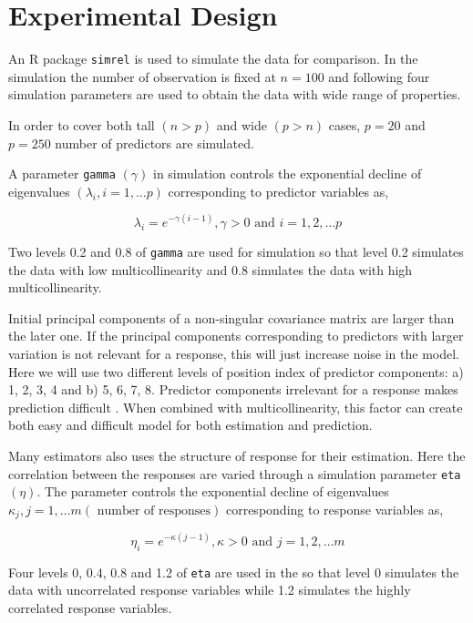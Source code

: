 \documentclass[12pt,3p,authoryear]{elsarticle}
\providecommand{\tightlist}{%
  \setlength{\itemsep}{0pt}\setlength{\parskip}{0pt}}
\begin{document}
\hypertarget{experimental-design}{\section{Experimental
Design}\label{experimental-design}}

An R \citep{coreR2018} package \texttt{simrel}
\citep{Rimal2018, saebo2015simrel} is used to simulate the data for
comparison. In the simulation the number of observation is fixed at
\(n = 100\) and following four simulation parameters are used to obtain
the data with wide range of properties.

\begin{description}
\tightlist
\item[\textbf{Number of predictors:}]
In order to cover both tall \((n>p)\) and wide \((p>n)\) cases, \(p=20\)
and \(p=250\) number of predictors are simulated.
\item[\textbf{Multicollinearity in predictor variables:}]
A parameter \texttt{gamma} \((\gamma)\) in simulation controls the
exponential decline of eigenvalues \((\lambda_i, i = 1, \ldots p)\)
corresponding to predictor variables as,

\begin{equation}
  \lambda_i = e^{-\gamma(i-1)}, \gamma > 0 \text{ and } i = 1, 2, \ldots p
  \label{eq:gamma}
  \end{equation}

Two levels 0.2 and 0.8 of \texttt{gamma} are used for simulation so that
level 0.2 simulates the data with low multicollinearity and 0.8
simulates the data with high multicollinearity.
\item[\textbf{Position of relevant components:}]
Initial principal components of a non-singular covariance matrix are
larger than the later one. If the principal components corresponding to
predictors with larger variation is not relevant for a response, this
will just increase noise in the model. Here we will use two different
levels of position index of predictor components: a) 1, 2, 3, 4 and b)
5, 6, 7, 8. Predictor components irrelevant for a response makes
prediction difficult \citep{Helland1994b}. When combined with
multicollinearity, this factor can create both easy and difficult model
for both estimation and prediction.
\item[\textbf{Correlation in response variables:}]
Many estimators also uses the structure of response for their
estimation. Here the correlation between the responses are varied
through a simulation parameter \texttt{eta} \((\eta)\). The parameter
controls the exponential decline of eigenvalues
\(\kappa_j, j = 1, \ldots m (\text{ number of responses})\)
corresponding to response variables as,

\begin{equation}
\eta_i = e^{-\kappa(j-1)}, \kappa > 0 \text{ and } j = 1, 2, \ldots m
\label{eq:eta}
\end{equation}

Four levels 0, 0.4, 0.8 and 1.2 of \texttt{eta} are used in the so that
level 0 simulates the data with uncorrelated response variables while
1.2 simulates the highly correlated response variables.
\end{description}
\end{document}
